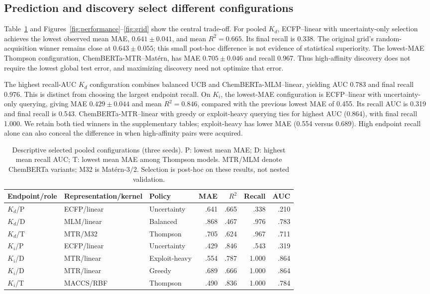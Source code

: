 \documentclass[wcp]{jmlr}
\begin{document}
\subsection{Prediction and discovery select different configurations}
Table~\ref{tab:results} and Figures~\ref{fig:performance}--\ref{fig:grid}
show the central trade-off. For pooled $K_d$, ECFP--linear with uncertainty-only
selection achieves the lowest observed mean MAE, $0.641\pm0.041$, and
mean $R^2=0.665$. Its final recall is 0.338. The original grid's
random-acquisition winner remains close at $0.643\pm0.055$; this small
post-hoc difference is not evidence of statistical superiority.
The lowest-MAE Thompson configuration, ChemBERTa-MTR--Mat\'ern,
has MAE $0.705\pm0.046$ and recall
0.967. Thus high-affinity discovery does not require the lowest global
test error, and maximizing discovery need not optimize that error.

The highest recall-AUC $K_d$ configuration combines balanced UCB and
ChemBERTa-MLM--linear, yielding AUC 0.783 and final recall 0.976. This is distinct
from choosing the largest endpoint recall. On $K_i$, the lowest-MAE
configuration is ECFP--linear with uncertainty-only querying, giving
MAE $0.429\pm0.044$ and mean $R^2=0.846$, compared with the previous
lowest MAE of 0.455. Its recall AUC is 0.319 and final recall is 0.543.
ChemBERTa-MTR--linear with greedy or exploit-heavy querying ties for
highest AUC (0.864), with final recall 1.000. We retain both tied winners
in the supplementary tables; exploit-heavy has lower MAE (0.554 versus 0.689).
High endpoint recall alone can also conceal the difference
in when high-affinity pairs were acquired.

\begin{table}[t]
\centering\small
\caption{Descriptive selected pooled configurations (three seeds).
P: lowest mean MAE; D: highest mean recall AUC; T: lowest mean MAE among
Thompson models. MTR/MLM denote ChemBERTa variants; M32 is Mat\'ern-$3/2$.
Selection is post-hoc on these results, not nested validation.}
\label{tab:results}
\begin{tabular}{lllrrrr}
\toprule
Endpoint/role & Representation/kernel & Policy & MAE & $R^2$ & Recall & AUC\\
\midrule
$K_d$/P & ECFP/linear & Uncertainty & .641 & .665 & .338 & .210\\
$K_d$/D & MLM/linear & Balanced & .868 & .467 & .976 & .783\\
$K_d$/T & MTR/M32 & Thompson & .705 & .624 & .967 & .711\\
$K_i$/P & ECFP/linear & Uncertainty & .429 & .846 & .543 & .319\\
$K_i$/D & MTR/linear & Exploit-heavy & .554 & .787 & 1.000 & .864\\
$K_i$/D & MTR/linear & Greedy & .689 & .666 & 1.000 & .864\\
$K_i$/T & MACCS/RBF & Thompson & .490 & .836 & 1.000 & .784\\
\bottomrule
\end{tabular}
\end{table}
\end{document}
